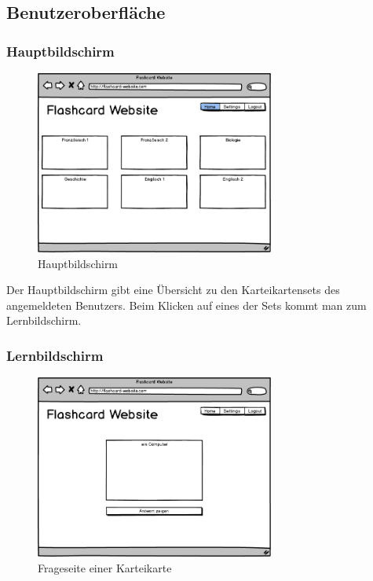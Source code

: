 \subsection{Benutzeroberfläche}
\subsubsection{Hauptbildschirm}

\begin{figure}[H]
    \centering
    \includegraphics[width=0.7\textwidth]{images/Overview.png}
    \caption{Hauptbildschirm}
    \label{fig:overview}
\end{figure}

Der Hauptbildschirm gibt eine Übersicht zu den Karteikartensets des angemeldeten Benutzers. Beim Klicken auf eines der Sets kommt man zum Lernbildschirm.


\subsubsection{Lernbildschirm}


\begin{figure}[H]
    \centering
    \includegraphics[width=0.7\textwidth]{images/Lernscreen-Frage.png}
    \caption{Frageseite einer Karteikarte}
    \label{fig:lernscreen-frage}
\end{figure}

